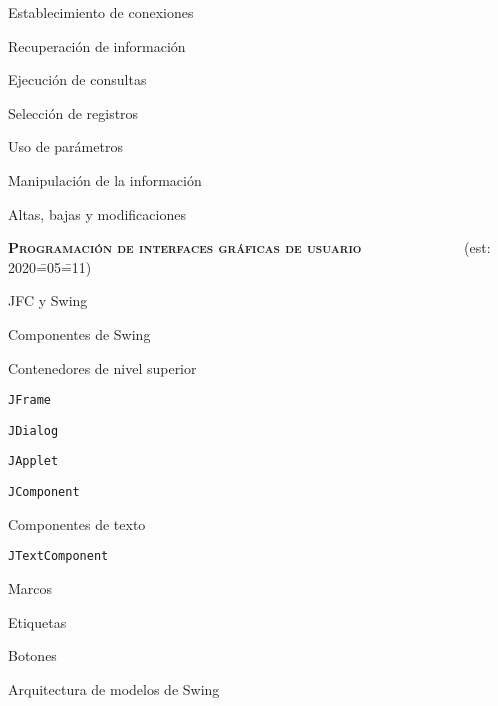 \begin{longenum}
\begin{longenum}
        \item Establecimiento de conexiones
        \item Recuperación de información
        \begin{longenum}
            \item Ejecución de consultas
            \item Selección de registros
            \item Uso de parámetros
        \end{longenum}
        \item Manipulación de la información
        \begin{longenum}
            \item Altas, bajas y modificaciones
        \end{longenum}
    \end{longenum}
    \item \textbf{\textsc{Programación de interfaces gráficas de usuario}} \ \ \ \ \ \ \ \ \ \opcional\ \ \ \ \ (est: 2020\==05\==11)
    \begin{longenum}
        \item JFC y Swing
        \item Componentes de Swing
        \item Contenedores de nivel superior
        \begin{longenum}
            \item \texttt{JFrame}
            \item \texttt{JDialog}
            \item \texttt{JApplet}
        \end{longenum}
        \item \texttt{JComponent}
        \item Componentes de texto
        \begin{longenum}
            \item \texttt{JTextComponent}
        \end{longenum}
        \item Marcos
        \item Etiquetas
        \item Botones
        \item Arquitectura de modelos de Swing
    \end{longenum}
\end{longenum}
